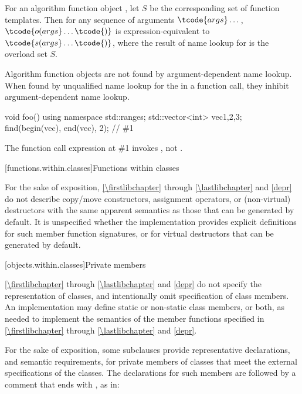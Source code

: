 \pnum
For an algorithm function object ,
let $S$ be the corresponding set of function templates.
Then for any sequence of arguments $\tcode{args} \dotsc$,
$\tcode{o(args} \dotsc \tcode{)}$ is expression-equivalent to
$\tcode{s(args} \dotsc \tcode{)}$,
where the result of name lookup for  is the overload set $S$.
\begin{note}
Algorithm function objects are not found by
argument-dependent name lookup.
When found by unqualified name lookup
for the  in a function call,
they inhibit argument-dependent name lookup.
\begin{example}
\begin{codeblock}
void foo() {
  using namespace std::ranges;
  std::vector<int> vec{1,2,3};
  find(begin(vec), end(vec), 2);        // \#1
}
\end{codeblock}
The function call expression at \#1 invokes ,
not .
\end{example}
\end{note}

[functions.within.classes]{Functions within classes}

\pnum
For the sake of exposition, \ref{\firstlibchapter} through \ref{\lastlibchapter}
and \ref{depr} do not describe copy/move constructors, assignment
operators, or (non-virtual) destructors with the same apparent
semantics as those that can be generated
by default.
%
%
%
It is unspecified whether
the implementation provides explicit definitions for such member function
signatures, or for virtual destructors that can be generated by default.

[objects.within.classes]{Private members}

\pnum
\ref{\firstlibchapter} through \ref{\lastlibchapter} and
\ref{depr} do not specify the representation of classes, and intentionally
omit specification of class members. An implementation may
define static or non-static class members, or both, as needed to implement the
semantics of the member functions specified in \ref{\firstlibchapter}
through \ref{\lastlibchapter} and \ref{depr}.

\pnum
For the sake of exposition,
some subclauses provide representative declarations, and semantic requirements, for
private members of classes that meet the external specifications of the classes.
The declarations for such members are
followed by a comment that ends with \expos, as in:

